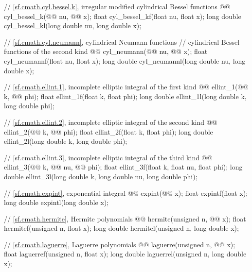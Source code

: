 \begin{codeblock}
{  // \ref{sf.cmath.cyl.bessel.k}, irregular modified cylindrical Bessel functions
  @@ cyl_bessel_k(@@ nu, @@ x);
  float               cyl_bessel_kf(float nu, float x);
  long double         cyl_bessel_kl(long double nu, long double x);

  // \ref{sf.cmath.cyl.neumann}, cylindrical Neumann functions
  // cylindrical Bessel functions of the second kind
  @@ cyl_neumann(@@ nu, @@ x);
  float               cyl_neumannf(float nu, float x);
  long double         cyl_neumannl(long double nu, long double x);

  // \ref{sf.cmath.ellint.1}, incomplete elliptic integral of the first kind
  @@ ellint_1(@@ k, @@ phi);
  float               ellint_1f(float k, float phi);
  long double         ellint_1l(long double k, long double phi);

  // \ref{sf.cmath.ellint.2}, incomplete elliptic integral of the second kind
  @@ ellint_2(@@ k, @@ phi);
  float               ellint_2f(float k, float phi);
  long double         ellint_2l(long double k, long double phi);

  // \ref{sf.cmath.ellint.3}, incomplete elliptic integral of the third kind
  @@ ellint_3(@@ k, @@ nu,
                               @@ phi);
  float               ellint_3f(float k, float nu, float phi);
  long double         ellint_3l(long double k, long double nu, long double phi);

  // \ref{sf.cmath.expint}, exponential integral
  @@ expint(@@ x);
  float               expintf(float x);
  long double         expintl(long double x);

  // \ref{sf.cmath.hermite}, Hermite polynomials
  @@ hermite(unsigned n, @@ x);
  float               hermitef(unsigned n, float x);
  long double         hermitel(unsigned n, long double x);

  // \ref{sf.cmath.laguerre}, Laguerre polynomials
  @@ laguerre(unsigned n, @@ x);
  float               laguerref(unsigned n, float x);
  long double         laguerrel(unsigned n, long double x);

}
\end{codeblock}
